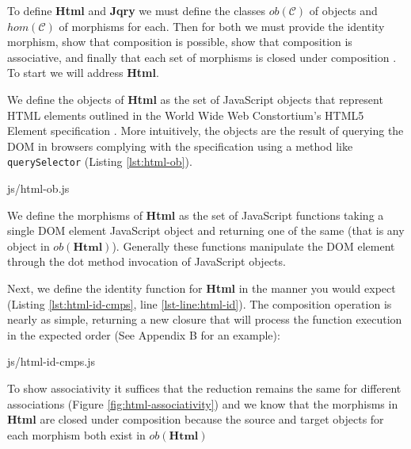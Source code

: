 \documentclass[preprint, leqno]{sigplanconf}
\begin{document}
To define \textbf{Html} and \textbf{Jqry} we must define the classes \begin{math}ob(\mathcal{C})\end{math} of objects and \begin{math}hom(\mathcal{C})\end{math} of morphisms for each. Then for both we must provide the identity morphism, show that composition is possible, show that composition is associative, and finally that each set of morphisms is closed under composition \cite[p. ~1]{bib:category-definition}. To start we will address \textbf{Html}.

We define the objects of \textbf{Html} as the set of JavaScript objects that represent HTML elements outlined in the World Wide Web Constortium's HTML5 Element specification \cite{bib:dom}. More intuitively, the objects are the result of querying the DOM in browsers complying with the specification using a method like \verb|querySelector| (Listing \ref{lst:html-ob}).

\begin{lstinputlisting}[
    language=JavaScript,
    caption={Sources of Html objects},
    label={lst:html-ob}
]{js/html-ob.js}
\end{lstinputlisting}

We define the morphisms of \textbf{Html} as the set of JavaScript functions taking a single DOM element JavaScript object and returning one of the same (that is any object in \begin{math}ob(\mathbf{Html})\end{math}). Generally these functions manipulate the DOM element through the dot method invocation of JavaScript objects.

Next, we define the identity function for \textbf{Html} in the manner you would expect (Listing \ref{lst:html-id-cmps}, line \ref{lst-line:html-id}). The composition operation is nearly as simple, returning a new closure that will process the function execution in the expected order (See Appendix B for an example):

\begin{lstinputlisting}[
    language=JavaScript,
    caption={Identity and Composition in Html},
    label={lst:html-id-cmps},
    escapeinside={@}{@}
]{js/html-id-cmps.js}
\end{lstinputlisting}

To show associativity it suffices that the reduction remains the same for different associations (Figure \ref{fig:html-associativity}) and we know that the morphisms in \textbf{Html} are closed under composition because the source and target objects for each morphism both exist in \begin{math}ob(\mathbf{Html})\end{math}
\end{document}
